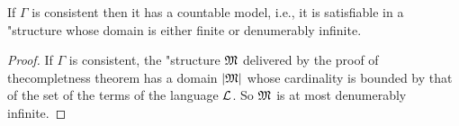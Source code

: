 \documentclass[../../include/open-logic-section]{subfiles}
\begin{document}

\begin{thm} 
If $\Gamma$ is consistent then it has a countable model, i.e., it is
satisfiable in a "{structure} whose domain is either finite or
denumerably infinite.
\end{thm}

\begin{proof}
  If $\Gamma$ is consistent, the "{structure} $\mathfrak M$ delivered by
  the proof of thecompletness theorem has a domain $\left| \mathfrak M \right|$ whose
  cardinality is bounded by that of the set of the terms of the
  language $\mathcal L$. So $\mathfrak M$ is at most denumerably infinite.
\end{proof}
\end{document}
